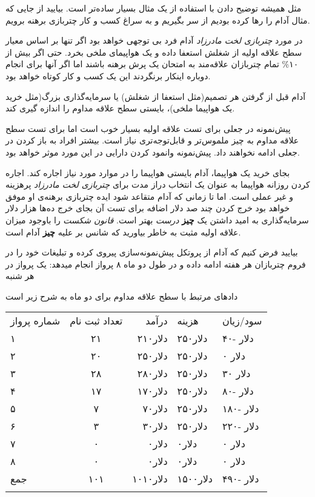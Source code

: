 مثل همیشه توضیح دادن با استفاده از یک مثال بسیار ساده‌تر است. بیایید از
جایی که مثال آدام را رها کرده‌ بودیم از سر بگیریم و به سراغ کسب و کار
چتربازی برهنه برویم.

در مورد \emph{چتربازی لخت مادرزاد} آدام فرد بی توجهی خواهد بود اگر تنها
بر اساس معیار سطح علاقه اولیه از شغلش استعفا داده و یک هواپیمای ملخی
بخرد. حتی اگر بیش از ۱۰\% تمام چتربازان علاقه‌مند به امتحان یک پرش برهنه
باشند اما اگر آنها برای انجام دوباره اینکار برنگردند این یک کسب و کار
کوتاه خواهد بود.

آدام قبل از گرفتن هر تصمیم(مثل استعفا از شغلش) یا سرمایه‌گذاری بزرگ(مثل
خرید یک هواپیما ملخی)، بایستی سطح علاقه مداوم را اندازه گیری کند.

پیش‌نمونه در جعلی برای تست علاقه اولیه بسیار خوب است اما برای تست سطح
علاقه مداوم به چیز ملموس‌تر و قابل‌توجه‌تری نیاز است. بیشتر افراد به باز
کردن در جعلی ادامه نخواهند داد. پیش‌نمونه وانمود کردن دارایی در این مورد
موثر خواهد بود.

بجای خرید یک هواپیما، آدام بایستی هواپیما را در موارد مورد نیاز اجاره
کند. اجاره کردن روزانه هواپیما به عنوان یک انتخاب دراز مدت برای
\emph{چتربازی لخت مادرزاد} پرهزینه و غیر عملی است. اما تا زمانی که آدام
متقاعد شود ایده چتربازی برهنه‌ی او موفق خواهد بود خرج کردن چند صد دلار
اضافه برای تست آن بجای خرج ده‌ها هزار دلار سرمایه‌گذاری به امید داشتن یک
\textbf{چیز} \emph{درست} بهتر است. \emph{قانون شکست} را باوجود میزان
علاقه اولیه مثبت به خاطر بیاورید که شانس بر علیه \textbf{چیز} آدام است.

بیایید فرض کنیم که آدام از پروتکل پیش‌نمونه‌سازی پیروی کرده و تبلیغات
خود را در فروم چتربازان هر هفته ادامه داده و در طول دو ماه ۸ پرواز انجام
میدهد: یک پرواز در هر شنبه

دادهای مرتبط با سطح علاقه مداوم برای دو ماه به شرح زیر است

\begin{longtable}[c]{@{}lcrll@{}}
\toprule\addlinespace
شماره پرواز & تعداد ثبت نام & درآمد & هزینه & سود/زیان
\\\addlinespace
\midrule\endhead
۱ & ۲۱ & ۲۱۰دلار & ۲۵۰دلار & ۴۰- دلار
\\\addlinespace
۲ & ۲۰ & ۲۵۰دلار & ۲۵۰دلار & ۰ دلار
\\\addlinespace
۳ & ۲۸ & ۲۸۰دلار & ۲۵۰دلار & ۳۰ دلار
\\\addlinespace
۴ & ۱۷ & ۱۷۰دلار & ۲۵۰دلار & ۸۰- دلار
\\\addlinespace
۵ & ۷ & ۷۰دلار & ۲۵۰دلار & ۱۸۰- دلار
\\\addlinespace
۶ & ۳ & ۳۰دلار & ۲۵۰دلار & ۲۲۰- دلار
\\\addlinespace
۷ & ۰ & ۰دلار & ۰دلار & ۰ دلار
\\\addlinespace
۸ & ۰ & ۰دلار & ۰دلار & ۰ دلار
\\\addlinespace
جمع & ۱۰۱ & ۱۰۱۰دلار & ۱۵۰۰دلار & ۴۹۰- دلار
\\\addlinespace
\bottomrule
\end{longtable}

